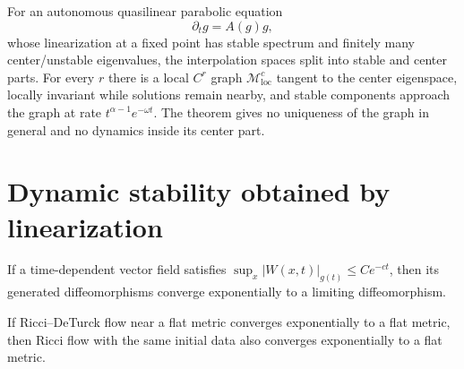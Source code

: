 \begin{theorem}
\label{thm:chow-iv-center-manifold}


For an autonomous quasilinear parabolic equation
\begin{equation*}
 \partial_tg=A(g)g,
 \tag{35.19}
\end{equation*}
whose linearization at a fixed point has stable spectrum and finitely many
center/unstable eigenvalues, the interpolation spaces split into stable and
center parts.  For every $r$ there is a local $C^r$ graph
$\mathcal M^c_{\mathrm{loc}}$ tangent to the center eigenspace, locally
invariant while solutions remain nearby, and stable components approach the
graph at rate $t^{\alpha-1}e^{-\omega t}$.  The theorem gives no uniqueness
of the graph in general and no dynamics inside its center part.
\end{theorem}

\section{Dynamic stability obtained by linearization}

\begin{lemma}
\label{lem:chow-iv-deturck-diffeomorphism-convergence}

If a time-dependent vector field satisfies
$\sup_x|W(x,t)|_{g(t)}\le Ce^{-ct}$, then its generated diffeomorphisms
converge exponentially to a limiting diffeomorphism.
\end{lemma}

\begin{corollary}
\label{cor:chow-iv-deturck-to-ricci-flow}


If Ricci--DeTurck flow near a flat metric converges exponentially to a flat
metric, then Ricci flow with the same initial data also converges exponentially
to a flat metric.
\end{corollary}

